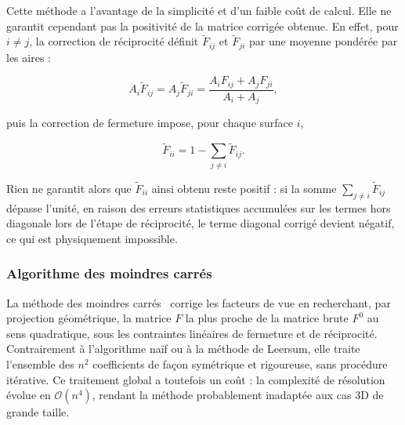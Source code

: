 Cette méthode a l'avantage de la simplicité et d'un faible coût de calcul. Elle ne garantit cependant pas la positivité de la matrice corrigée obtenue. En effet, pour $i \neq j$, la correction de réciprocité définit $\tilde{F}_{ij}$ et $\tilde{F}_{ji}$ par une moyenne pondérée par les aires :

\begin{equation}
    A_i \tilde{F}_{ij} = A_j \tilde{F}_{ji} = \frac{A_i F_{ij} + A_j F_{ji}}{A_i + A_j},
\end{equation}

puis la correction de fermeture impose, pour chaque surface $i$,

\begin{equation}
    \tilde{F}_{ii} = 1 - \sum_{j \neq i} \tilde{F}_{ij}.
\end{equation}

Rien ne garantit alors que $\tilde{F}_{ii}$ ainsi obtenu reste positif : si la somme $\sum_{j \neq i} \tilde{F}_{ij}$ dépasse l'unité, en raison des erreurs statistiques accumulées sur les termes hors diagonale lors de l'étape de réciprocité, le terme diagonal corrigé devient négatif, ce qui est physiquement impossible.


\subsubsection{Algorithme des moindres carrés}
La méthode des moindres carrés~\cite{renforcement95} corrige les facteurs de vue en recherchant, par projection géométrique, la matrice $F$ la plus proche de la matrice brute $F^0$ au sens quadratique, sous les contraintes linéaires de fermeture et de réciprocité. Contrairement à l'algorithme naïf ou à la méthode de Leersum, elle traite l'ensemble des $n^2$ coefficients de façon symétrique et rigoureuse, sans procédure itérative. Ce traitement global a toutefois un coût : la complexité de résolution évolue en $\mathcal{O}(n^4)$, rendant la méthode probablement inadaptée aux cas 3D de grande taille.
